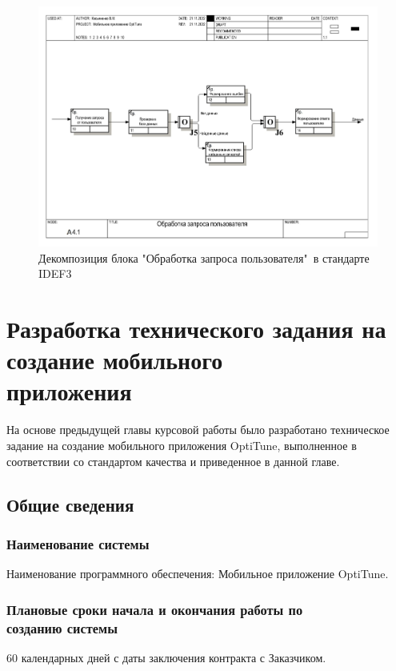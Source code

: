 \documentclass[14pt]{extreport}
\begin{document}
\begin{landscape}
\begin{figure}[H]
\centerline{\includegraphics[width=0.9\linewidth]{idef313}}
\caption{Декомпозиция блока "Обработка запроса пользователя"\ в стандарте IDEF3}
\label{fig21}
\end{figure}
\end{landscape}





\chapter{Разработка технического задания на создание мобильного \\ приложения}

На основе предыдущей главы курсовой работы было разработано техническое задание на создание мобильного приложения OptiTune, выполненное в соответствии со стандартом качества \cite{bib7} и приведенное в данной главе.

\newpage
\section{Общие сведения}
\subsection{Наименование системы}
Наименование программного обеспечения: Мобильное приложение OptiTune.

\subsection{Плановые сроки начала и окончания работы по \\ созданию системы}
60 календарных дней с даты заключения контракта с Заказчиком.
\end{document}
